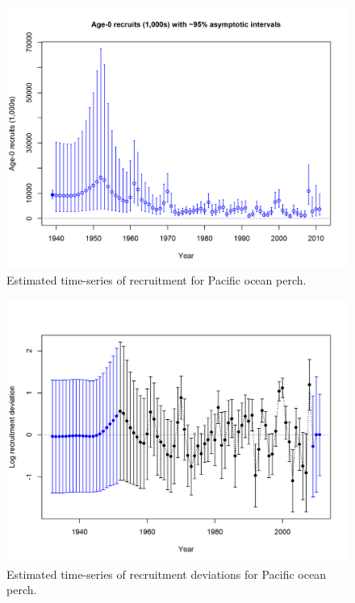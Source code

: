 \documentclass[12pt,]{article}
\begin{document}
\begin{figure}
\centering
\includegraphics{r4ss/plots_mod1/ts11_Age-0_recruits_(1000s)_with_95_asymptotic_intervals.png}
\caption{Estimated time-series of recruitment for Pacific ocean perch.
\label{fig:recruits}}
\end{figure}

\FloatBarrier

\begin{figure}
\centering
\includegraphics{r4ss/plots_mod1/recdevs2_withbars.png}
\caption{Estimated time-series of recruitment deviations for Pacific
ocean perch. \label{fig:recdevs}}
\end{figure}
\end{document}
